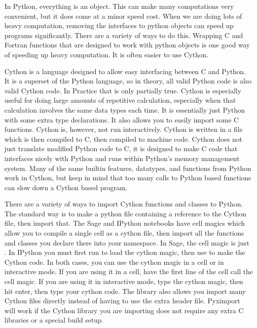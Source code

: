 

In Python, everything is an object.
This can make many computations very convenient, but it does come at a minor speed cost.
When we are doing lots of heavy computation, removing the interfaces to python objects can speed up programs significantly.
There are a variety of ways to do this.
Wrapping C and Fortran functions that are designed to work with python objects is one good way of speeding up heavy computation.
It is often easier to use Cython.

Cython is a language designed to allow easy interfacing between C and Python.
It is a superset of the Python language, so in theory, all valid Python code is also valid Cython code.
In Practice that is only partially true.
Cython is especially useful for doing large amounts of repetitive calculation, especially when that calculation involves the same data types each time.
It is essentially just Python with some extra type declarations.
It also allows you to easily import some C functions.
Cython is, however, not run interactively.
Cython is written in a  file which is then compiled to C, then compiled to machine code.
Cython does not just translate modified Python code to C, it is designed to make C code that interfaces nicely with Python and runs within Python's memory management system.
Many of the same builtin features, datatypes, and functions from Python work in Cython, but keep in mind that too many calls to Python based functions can slow down a Cython based program.

There are a variety of ways to import Cython functions and classes to Python.
The standard way is to make a python file containing a reference to the Cython file, then import that.
The Sage and IPython notebooks have cell magics which allow you to compile a single cell as a cython file, then import all the functions and classes you declare there into your namespace.
In Sage, the cell magic is just .
In IPython you must first run  to load the cython magic, then use  to make the Cython code.
In both cases, you can use the cython magic in a cell or in interactive mode.
If you are using it in a cell, have the first line of the cell call the cell magic.
If you are using it in interactive mode, type the cython magic, then hit enter, then type your cython code.
The library  also allows you import many Cython files directly instead of having to use the extra header file.
Pyximport will work if the Cython library you are importing does not require any extra C libraries or a special build setup.

